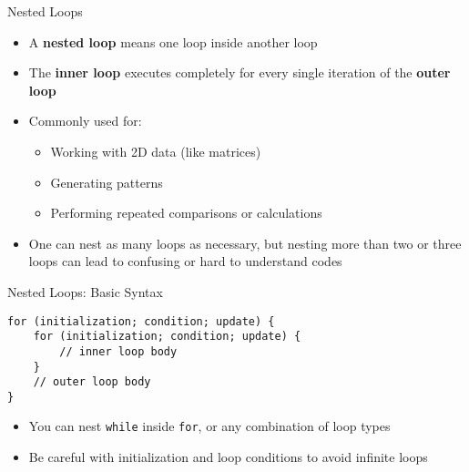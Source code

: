 \documentclass[12pt, aspectratio=169]{beamer}
\begin{document}
    \begin{frame}{Nested Loops}
        \begin{itemize}
            \item A \textbf{nested loop} means one loop inside another loop
            \item The \textbf{inner loop} executes completely for every single iteration of the \textbf{outer loop}
            \item Commonly used for:
            \begin{itemize}
                \item Working with 2D data (like matrices)
                \item Generating patterns
                \item Performing repeated comparisons or calculations
            \end{itemize}
            \item One can nest as many loops as necessary, but nesting more than two or three loops can lead to confusing or hard to understand codes
        \end{itemize}
    \end{frame}


    \begin{frame}[fragile]{Nested Loops: Basic Syntax}
        \begin{verbatim}
for (initialization; condition; update) {
    for (initialization; condition; update) {
        // inner loop body
    }
    // outer loop body
}
        \end{verbatim}

        \begin{itemize}
            \item You can nest \texttt{while} inside \texttt{for}, or any combination of loop types
            \item Be careful with initialization and loop conditions to avoid infinite loops
        \end{itemize}
    \end{frame}




\end{document}
